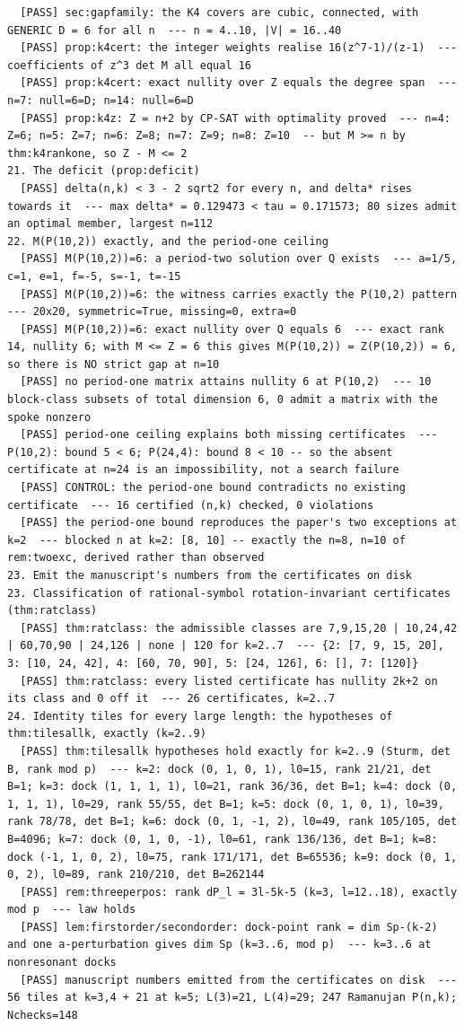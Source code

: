 \documentclass[11pt]{article}
\begin{document}
\begin{verbatim}
  [PASS] sec:gapfamily: the K4 covers are cubic, connected, with GENERIC D = 6 for all n  --- n = 4..10, |V| = 16..40
  [PASS] prop:k4cert: the integer weights realise 16(z^7-1)/(z-1)  --- coefficients of z^3 det M all equal 16
  [PASS] prop:k4cert: exact nullity over Z equals the degree span  --- n=7: null=6=D; n=14: null=6=D
  [PASS] prop:k4z: Z = n+2 by CP-SAT with optimality proved  --- n=4: Z=6; n=5: Z=7; n=6: Z=8; n=7: Z=9; n=8: Z=10  -- but M >= n by thm:k4rankone, so Z - M <= 2
21. The deficit (prop:deficit)
  [PASS] delta(n,k) < 3 - 2 sqrt2 for every n, and delta* rises towards it  --- max delta* = 0.129473 < tau = 0.171573; 80 sizes admit an optimal member, largest n=112
22. M(P(10,2)) exactly, and the period-one ceiling
  [PASS] M(P(10,2))=6: a period-two solution over Q exists  --- a=1/5, c=1, e=1, f=-5, s=-1, t=-15
  [PASS] M(P(10,2))=6: the witness carries exactly the P(10,2) pattern  --- 20x20, symmetric=True, missing=0, extra=0
  [PASS] M(P(10,2))=6: exact nullity over Q equals 6  --- exact rank 14, nullity 6; with M <= Z = 6 this gives M(P(10,2)) = Z(P(10,2)) = 6, so there is NO strict gap at n=10
  [PASS] no period-one matrix attains nullity 6 at P(10,2)  --- 10 block-class subsets of total dimension 6, 0 admit a matrix with the spoke nonzero
  [PASS] period-one ceiling explains both missing certificates  --- P(10,2): bound 5 < 6; P(24,4): bound 8 < 10 -- so the absent certificate at n=24 is an impossibility, not a search failure
  [PASS] CONTROL: the period-one bound contradicts no existing certificate  --- 16 certified (n,k) checked, 0 violations
  [PASS] the period-one bound reproduces the paper's two exceptions at k=2  --- blocked n at k=2: [8, 10] -- exactly the n=8, n=10 of rem:twoexc, derived rather than observed
23. Emit the manuscript's numbers from the certificates on disk
23. Classification of rational-symbol rotation-invariant certificates (thm:ratclass)
  [PASS] thm:ratclass: the admissible classes are 7,9,15,20 | 10,24,42 | 60,70,90 | 24,126 | none | 120 for k=2..7  --- {2: [7, 9, 15, 20], 3: [10, 24, 42], 4: [60, 70, 90], 5: [24, 126], 6: [], 7: [120]}
  [PASS] thm:ratclass: every listed certificate has nullity 2k+2 on its class and 0 off it  --- 26 certificates, k=2..7
24. Identity tiles for every large length: the hypotheses of thm:tilesallk, exactly (k=2..9)
  [PASS] thm:tilesallk hypotheses hold exactly for k=2..9 (Sturm, det B, rank mod p)  --- k=2: dock (0, 1, 0, 1), l0=15, rank 21/21, det B=1; k=3: dock (1, 1, 1, 1), l0=21, rank 36/36, det B=1; k=4: dock (0, 1, 1, 1), l0=29, rank 55/55, det B=1; k=5: dock (0, 1, 0, 1), l0=39, rank 78/78, det B=1; k=6: dock (0, 1, -1, 2), l0=49, rank 105/105, det B=4096; k=7: dock (0, 1, 0, -1), l0=61, rank 136/136, det B=1; k=8: dock (-1, 1, 0, 2), l0=75, rank 171/171, det B=65536; k=9: dock (0, 1, 0, 2), l0=89, rank 210/210, det B=262144
  [PASS] rem:threeperpos: rank dP_l = 3l-5k-5 (k=3, l=12..18), exactly mod p  --- law holds
  [PASS] lem:firstorder/secondorder: dock-point rank = dim Sp-(k-2) and one a-perturbation gives dim Sp (k=3..6, mod p)  --- k=3..6 at nonresonant docks
  [PASS] manuscript numbers emitted from the certificates on disk  --- 56 tiles at k=3,4 + 21 at k=5; L(3)=21, L(4)=29; 247 Ramanujan P(n,k); Nchecks=148


\end{verbatim}
\end{document}
